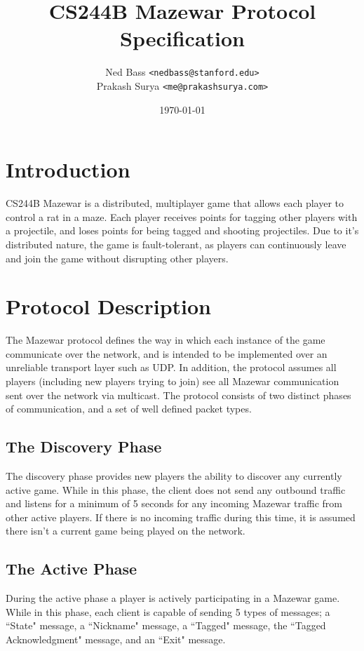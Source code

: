 \documentclass{article}
\title{CS244B Mazewar Protocol Specification}
\author{Ned Bass      \texttt{<nedbass@stanford.edu>} \\
        Prakash Surya \texttt{<me@prakashsurya.com>}}
\date{\today}
\begin{document}
\maketitle

\section{Introduction}
CS244B Mazewar is a distributed, multiplayer game that allows each
player to control a rat in a maze. Each player receives points for
tagging other players with a projectile, and loses points for being
tagged and shooting projectiles. Due to it's distributed nature, the
game is fault-tolerant, as players can continuously leave and join the
game without disrupting other players.

\section{Protocol Description}
The Mazewar protocol defines the way in which each instance of
the game communicate over the network, and is intended to be implemented
over an unreliable transport layer such as UDP. In addition, the
protocol assumes all players (including new players trying to join) see
all Mazewar communication sent over the network via multicast. The
protocol consists of two distinct phases of communication, and a set
of well defined packet types.

\subsection{The Discovery Phase}
The discovery phase provides new players the ability to discover any
currently active game. While in this phase,
the client does not send any outbound traffic and listens for
a minimum of 5 seconds for any incoming Mazewar
traffic from other active players. If there is no incoming traffic
during this time, it is assumed there isn't a current game being played
on the network.

\subsection{The Active Phase}
During the active phase a player is actively participating
in a Mazewar game. While in this phase, each client is
capable of sending 5 types of messages; a ``State" message, a
``Nickname" message, a ``Tagged" message, the ``Tagged Acknowledgment"
message, and an ``Exit" message.
\end{document}
